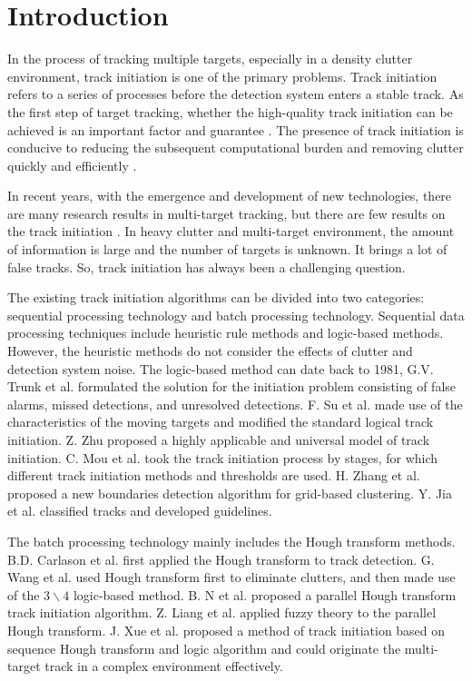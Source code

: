 \documentclass[default,iicol]{sn-jnl}%
\theoremstyle{thmstyleone}%
\theoremstyle{thmstyletwo}%
\theoremstyle{thmstylethree}%
\begin{document}
\section{Introduction}\label{sec1}

\small In the process of tracking multiple targets, especially in a density clutter environment, track initiation is one of the primary problems. Track initiation refers to a series of processes before the detection system enters a stable track. As the first step of target tracking, whether the high-quality track initiation can be achieved is an important factor and guarantee  \cite{bib1}. The presence of track initiation is conducive to reducing the subsequent computational burden and removing clutter quickly and efficiently  \cite{bib2}.

In recent years, with the emergence and development of new technologies, there are many research results in multi-target tracking, but there are few results on the track initiation \cite{bib3}. In heavy clutter and multi-target environment, the amount of information is large and the number of targets is unknown. It brings a lot of false tracks. So, track initiation has always been a challenging question.

The existing track initiation algorithms can be divided into two categories: sequential processing technology and batch processing technology. Sequential data processing techniques include heuristic rule methods and logic-based methods. However, the heuristic methods do not consider the effects of clutter and detection system noise. The logic-based method can date back to 1981, G.V. Trunk et al. \cite{bib4} formulated the solution for the initiation problem consisting of false alarms, missed detections, and unresolved detections. F. Su et al. \cite{bib5} made use of the characteristics of the moving targets and modified the standard logical track initiation. Z. Zhu \cite{bib6} proposed a highly applicable and universal model of track initiation. C. Mou et al. \cite{bib7} took the track initiation process by stages, for which different track initiation methods and thresholds are used. H. Zhang et al. \cite{bib8} proposed a new boundaries detection algorithm for grid-based clustering. Y. Jia et al. \cite{bib9} classified tracks and developed guidelines.

The batch processing technology mainly includes the Hough transform methods. B.D. Carlason et al. \cite{bib10} first applied the Hough transform to track detection. G. Wang et al. \cite{bib11} used Hough transform first to eliminate clutters, and then made use of the $3 \backslash 4$ logic-based method. B. N et al. \cite{bib12} proposed a parallel Hough transform track initiation algorithm. Z. Liang et al. \cite{bib13} applied fuzzy theory to the parallel Hough transform. J. Xue et al. \cite{bib14} proposed a method of track initiation based on sequence Hough transform and logic algorithm and could originate the multi-target track in a complex environment effectively.
\end{document}
